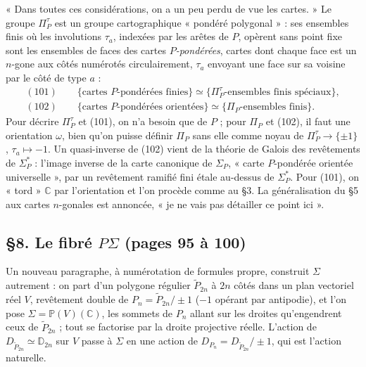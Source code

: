 \documentclass[11pt,a4paper]{article}
\begin{document}
« Dans toutes ces considérations, on a un peu perdu de vue les cartes. » Le
groupe $\Pi^{\tau}_P$ est un groupe cartographique « pondéré polygonal » : ses
ensembles finis où les involutions $\tau_a$, indexées par les arêtes de $P$,
opèrent sans point fixe sont les ensembles de faces des cartes
\emph{$P$-pondérées}, cartes dont chaque face est un $n$-gone aux côtés
numérotés circulairement, $\tau_a$ envoyant une face sur sa voisine par le
côté de type $a$ :
\[
\begin{gathered}
(101)\qquad \{\text{cartes } P\text{-pondérées finies}\} \simeq \{\Pi^{\tau}_P\text{-ensembles finis spéciaux}\}, \\
(102)\qquad \{\text{cartes } P\text{-pondérées orientées}\} \simeq \{\Pi_P\text{-ensembles finis}\}.
\end{gathered}
\]
Pour décrire $\Pi^{\tau}_P$ et (101), on n'a besoin que de $P$ ; pour $\Pi_P$ et
(102), il faut une orientation $\omega$, bien qu'on puisse définir $\Pi_P$
sans elle comme noyau de $\Pi^{\tau}_P \to \{\pm 1\}$, $\tau_a \mapsto -1$.
Un quasi-inverse de (102) vient de la théorie de Galois des revêtements de
$\Sigma^*_P$ : l'image inverse de la carte canonique de $\Sigma_P$, « carte
$P$-pondérée orientée universelle », par un revêtement ramifié fini étale
au-dessus de $\Sigma^*_P$. Pour (101), on « tord » $\mathbb{C}$ par l'orientation
et l'on procède comme au §3. La généralisation du §5 aux cartes $n$-gonales est
annoncée, « je ne vais pas détailler ce point ici ».

\subsection*{§8. Le fibré $P\Sigma$ (pages 95 à 100)}

Un nouveau paragraphe, à numérotation de formules propre, construit $\Sigma$
autrement : on part d'un polygone régulier $\tilde P_{2n}$ à $2n$ côtés dans un
plan vectoriel réel $V$, revêtement double de $P_n = \tilde P_{2n}/\pm 1$
($-1$ opérant par antipodie), et l'on pose $\Sigma = \mathbb{P}(V)(\mathbb{C})$,
les sommets de $P_n$ allant sur les droites qu'engendrent ceux de
$\tilde P_{2n}$ ; tout se factorise par la droite projective réelle. L'action
de $D_{\tilde P_{2n}} \simeq \mathbb{D}_{2n}$ sur $V$ passe à $\Sigma$ en une
action de $D_{P_n} = D_{\tilde P_{2n}}/\pm 1$, qui est l'action naturelle.
\end{document}
